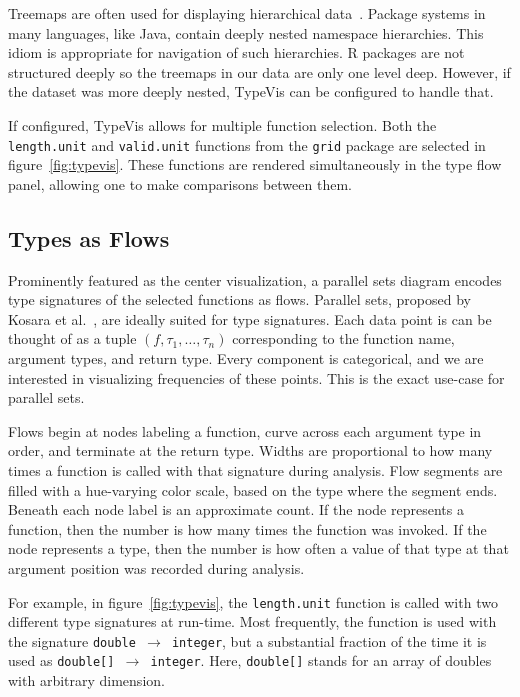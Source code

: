 \documentclass{vgtc}                          %
\begin{document}
Treemaps are often used for displaying hierarchical data~\cite{shneiderman:1992}.
Package systems in many languages,
like Java,
contain deeply nested namespace hierarchies.
This idiom is appropriate for navigation of such
hierarchies.
R packages are not structured deeply
so the treemaps in our data are only one
level deep.
However, if the dataset was more deeply nested,
{\sc TypeVis} can be configured to
handle that.

If configured, {\sc TypeVis} allows for multiple function selection.
Both the {\tt length.unit} and {\tt valid.unit} functions
from the {\tt grid} package are selected in figure~\ref{fig:typevis}.
These functions are rendered simultaneously in the type flow
panel, allowing one to make comparisons between them.

\subsection{Types as Flows}

Prominently featured as the center visualization,
a parallel sets diagram encodes type signatures of the selected
functions as flows.
Parallel sets,
proposed by Kosara et al.~\cite{kosara:2006},
are ideally suited for type signatures.
Each data point is can be thought of as
a tuple $(f, \tau_1, \ldots, \tau_n)$
corresponding to the function name,
argument types,
and return type.
Every component is categorical,
and we are interested in visualizing frequencies of these points.
This is the exact use-case for parallel sets.

Flows begin at nodes labeling a function,
curve across each argument type in order,
and terminate at the return type.
Widths are proportional to how many times a function
is called with that signature during analysis.
Flow segments are filled with a hue-varying color scale,
based on the type where the segment ends.
Beneath each node label is an approximate count.
If the node represents a function, then the
number is how many times the function was invoked.
If the node represents a type, then the
number is how often a value of that type
at that argument position was recorded during analysis.

For example, in figure~\ref{fig:typevis},
the {\tt length.unit} function is called with
two different type signatures at run-time.
Most frequently, the function is used with the
signature {\tt double $\to$ integer},
but a substantial fraction of the time it is
used as {\tt double[] $\to$ integer}.
Here, {\tt double[]} stands for an array of
doubles with arbitrary dimension.
\end{document}

